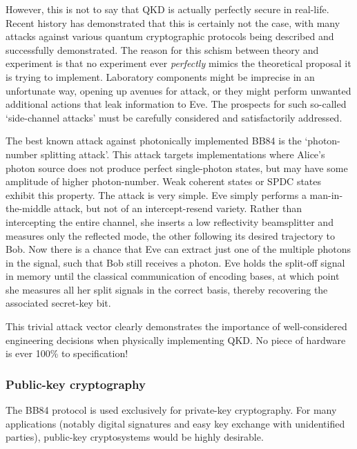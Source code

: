 However, this is not to say that QKD is actually perfectly secure in real-life. Recent history has demonstrated that this is certainly not the case, with many attacks against various quantum cryptographic protocols being described and successfully demonstrated. The reason for this schism between theory and experiment is that no experiment ever \textit{perfectly} mimics the theoretical proposal it is trying to implement. Laboratory components might be imprecise in an unfortunate way, opening up avenues for attack, or they might perform unwanted additional actions that leak information to Eve. The prospects for such so-called `side-channel attacks' must be carefully considered and satisfactorily addressed.

The best known attack against photonically implemented BB84 is the `photon-number splitting attack'. This attack targets implementations where Alice's photon source does not produce perfect single-photon states, but may have some amplitude of higher photon-number. Weak coherent states or SPDC states exhibit this property. The attack is very simple. Eve simply performs a man-in-the-middle attack, but not of an intercept-resend variety. Rather than intercepting the entire channel, she inserts a low reflectivity beamsplitter and measures only the reflected mode, the other following its desired trajectory to Bob. Now there is a chance that Eve can extract just one of the multiple photons in the signal, such that Bob still receives a photon. Eve holds the split-off signal in memory until the classical communication of encoding bases, at which point she measures all her split signals in the correct basis, thereby recovering the associated secret-key bit.

This trivial attack vector clearly demonstrates the importance of well-considered engineering decisions when physically implementing QKD. No piece of hardware is ever 100\% to specification!

\subsubsection{Public-key cryptography}

The BB84 protocol is used exclusively for private-key cryptography. For many applications (notably digital signatures and easy key exchange with unidentified parties), public-key cryptosystems would be highly desirable.

